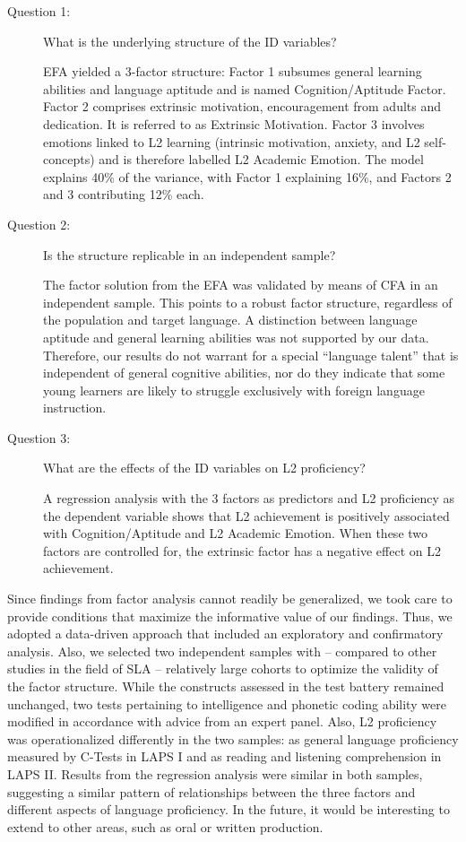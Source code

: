 \documentclass[output=paper]{langsci/langscibook}
\begin{document}
\begin{description}
\item[Question 1:] What is the underlying structure of the ID variables? 

EFA yielded a 3-factor structure: Factor 1 subsumes general learning abilities and language aptitude and is named Cognition/Aptitude Factor. Factor 2 comprises extrinsic motivation, encouragement from adults and dedication. It is referred to as Extrinsic Motivation. Factor 3 involves emotions linked to L2 learning (intrinsic motivation, anxiety, and L2 self-concepts) and is therefore labelled L2 Academic Emotion. The model explains 40\% of the variance, with Factor 1 explaining 16\%, and Factors 2 and 3 contributing 12\% each.

\item[Question 2:] Is the structure replicable in an independent sample? 

The factor solution from the EFA was validated by means of CFA in an independent sample. This points to a robust factor structure, regardless of the population and target language. A distinction between language aptitude and general learning abilities was not supported by our data. Therefore, our results do not warrant for a special “language talent” that is independent of general cognitive abilities, nor do they indicate that some young learners are likely to struggle exclusively with foreign language instruction.

\item[Question 3:] What are the effects of the ID variables on L2 proficiency? 

A regression analysis with the 3 factors as predictors and L2 proficiency as the dependent variable shows that L2 achievement is positively associated with Cognition/Aptitude and L2 Academic Emotion. When these two factors are controlled for, the extrinsic factor has a negative effect on L2 achievement. 
\end{description}

Since findings from factor analysis cannot readily be generalized, we took care to provide conditions that maximize the informative value of our findings. Thus, we adopted a data-driven approach that included an exploratory and confirmatory analysis. Also, we selected two independent samples with – compared to other studies in the field of SLA – relatively large cohorts to optimize the validity of the factor structure. While the constructs assessed in the test battery remained unchanged, two tests pertaining to intelligence and phonetic coding ability were modified in accordance with advice from an expert panel. Also, L2 proficiency was operationalized differently in the two samples: as general language proficiency measured by C-Tests in LAPS I and as reading and listening comprehension in LAPS II. Results from the regression analysis were similar in both samples, suggesting a similar pattern of relationships between the three factors and different aspects of language proficiency. In the future, it would be interesting to extend to other areas, such as oral or written production. 
\end{document}
